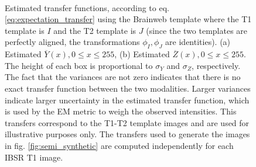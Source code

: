 \begin{figure}[H]
\centering
    \\
    \caption{Estimated transfer functions, according to eq. \eqref{eq:expectation_transfer} using the Brainweb template where the T1 template is $I$ and the T2 template is $J$
    (since the two templates are perfectly aligned, the transformations $\phi_{I}, \phi_{J}$ are identities). (a) Estimated $\overline{Y}(x), 0\leq x \leq 255$, (b) Estimated $\overline{Z}(x), 0\leq x \leq 255$. The height of each box is proportional to $\sigma_{Y}$ and $\sigma_{Z}$, respectively. The fact that the variances are not zero indicates that there is no exact transfer function between the two modalities. Larger variances indicate larger uncertainty in the estimated transfer function, which is used by the EM metric to weigh the observed intensities. This transfers correspond to the T1-T2 template images and are used for illustrative purposes only. The transfers used to generate the images in fig. \ref{fig:semi_synthetic} are computed independently for each IBSR T1 image.}
\label{fig:transfers}
\end{figure}


